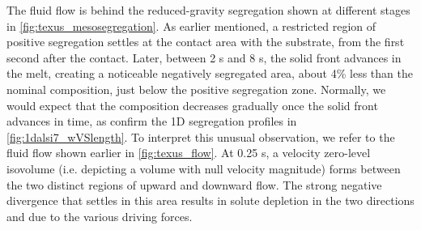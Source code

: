 The fluid flow is behind the reduced-gravity segregation shown at different stages in \cref{fig:texus_mesosegregation}.
As earlier mentioned, a restricted region of positive segregation settles at the contact area with the substrate,
from the first second after the contact. Later, between 2 s and 8 s, the solid front advances in the melt, creating 
a noticeable negatively segregated area, about 4\% less than the nominal composition, just below the positive segregation zone.
Normally, we would expect that the composition decreases gradually once the solid front advances in time, as confirm the 1D segregation
profiles in \cref{fig:1dalsi7_wVSlength}. To interpret this unusual observation, we refer to the fluid flow shown earlier in \cref{fig:texus_flow}.
At 0.25 s, a velocity zero-level isovolume (i.e. depicting a volume with null velocity magnitude) forms between the two distinct regions
of upward and downward flow. The strong negative divergence that settles in this area results in solute depletion in the two directions
and due to the various driving forces. 

